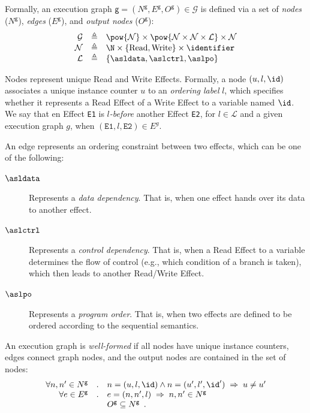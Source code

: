 \documentclass{book}
\newcommand\xgraph[0]{\textsf{g}}
\newcommand\Nodes[0]{\mathcal{N}}
\newcommand\Read[0]{\text{Read}}
\newcommand\Write[0]{\text{Write}}
\newcommand\Labels[0]{\mathcal{L}}
\newcommand\XGraphs[0]{\mathcal{G}}
\begin{document}
Formally, an execution graph $\xgraph = (N^\xgraph, E^\xgraph, O^\xgraph) \in \XGraphs$
is defined via a set of \emph{nodes} ($N^\xgraph$), \emph{edges} ($E^\xgraph$), and \emph{output nodes} ($O^\xgraph$):
\[
\begin{array}{rcl}
  \XGraphs   	    &\triangleq& \pow{\Nodes} \times \pow{\Nodes \times \Nodes \times \Labels} \times \Nodes  \\
  \Nodes            &\triangleq& \N \times \{ \Read, \Write \} \times \identifier \\
  \Labels           &\triangleq& \{ \asldata, \aslctrl, \aslpo \}
\end{array}
\]

Nodes represent unique Read and Write Effects. Formally, a node $(u,l,\id)$ associates a unique instance counter $u$
to an \emph{ordering label} $l$, which specifies whether it represents a Read Effect of a Write Effect to a variable named $\id$.
%
We say that en Effect \texttt{E1} is \emph{$l$-before} another Effect \texttt{E2}, for $l\in \Labels$ and a given execution graph
$g$, when $(\texttt{E1}, l, \texttt{E2}) \in E^g$.

An edge represents an ordering constraint between two effects, which can be one of the following:
\begin{description}
\item[$\asldata$] Represents a \emph{data dependency}.
That is, when one effect hands over its data to another effect.
\item[$\aslctrl$] Represents a \emph{control dependency}.
That is, when a Read Effect to a variable determines the flow of control (e.g., which condition of a branch is taken),
which then leads to another Read/Write Effect.
\item[$\aslpo$] Represents a \emph{program order}.
That is, when two effects are defined to be ordered according to the sequential semantics.
\end{description}

An execution graph is \emph{well-formed} if all nodes have unique instance counters, edges connect graph nodes,
and the output nodes are contained in the set of nodes:
\[
  \begin{array}{rcl}
  \forall n, n' \in N^\xgraph &.& n=(u,l,\id) \wedge n=(u',l',\id') \;\Rightarrow\; u \neq u' \\
  \forall e \in E^\xgraph &.& e=(n, n', l) \;\Rightarrow\; n, n' \in N^\xgraph \\
  & & O^\xgraph \subseteq N^\xgraph \enspace.
  \end{array}
\]
\end{document}
